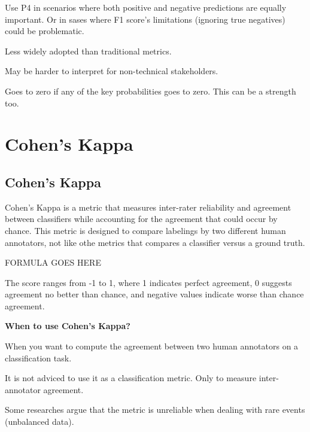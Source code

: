 Use P4 in scenarios where both positive and negative predictions are equally important. Or in sases where F1 score's limitations (ignoring true negatives)
could be problematic.

{
    \item Less widely adopted than traditional metrics.
    \item May be harder to interpret for non-technical stakeholders.
    \item Goes to zero if any of the key probabilities goes to zero. This can be a strength too.
}


\clearpage
\thispagestyle{classificationstyle}
\section{Cohen's Kappa}
\subsection{Cohen's Kappa}

Cohen's Kappa is a metric that measures inter-rater reliability and agreement between classifiers while accounting for the agreement that could occur by chance.
This metric is designed to compare labelings by two different human annotators, not like othe metrics that compares a classifier versus a ground truth.

% 
FORMULA GOES HERE
% 

The score ranges from -1 to 1, where 1 indicates perfect agreement, 0 suggests agreement no better than chance, and negative values indicate worse than chance agreement.

\textbf{When to use Cohen's Kappa?}

When you want to compute the agreement between two human annotators on a classification task.

{
    \item It is not adviced to use it as a classification metric. Only to measure inter-annotator agreement.
    \item Some researches argue that the metric is unreliable when dealing with rare events (unbalanced data).
}

